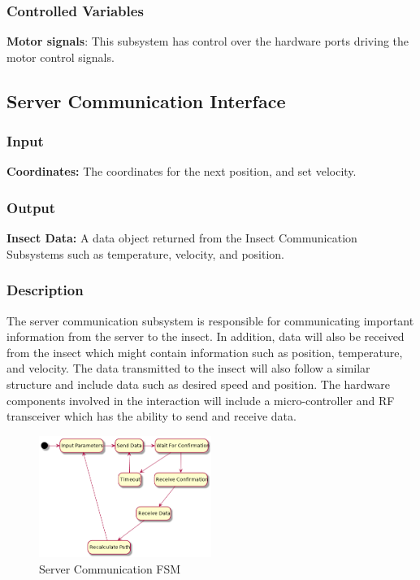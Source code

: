 \documentclass[11pt]{article}
\begin{document}
\subsubsection{Controlled Variables}
\textbf{Motor signals}: This subsystem has control over the hardware ports driving the motor control signals.


\subsection{Server Communication Interface}
\subsubsection{Input}
\textbf{Coordinates:} The coordinates for the next position, and set velocity. 
\subsubsection{Output}
\textbf{Insect Data:} A data object returned from the Insect Communication Subsystems such as temperature, velocity, and position.
\subsubsection{Description}
The server communication subsystem is responsible for communicating important information from the server to the insect. In addition, data will also be received from the insect which might contain information such as position, temperature, and velocity.  The data transmitted to the insect will also follow a similar structure and include data such as desired speed and position. The hardware components involved in the interaction will include a micro-controller and RF transceiver which has the ability to send and receive data. 

\begin{figure}[H]
   \centering
   \includegraphics[width=0.5\textwidth]{img/serverCom.png}
   \caption{Server Communication FSM}
   \label{fig:fsm}
\end{figure}
\end{document}

